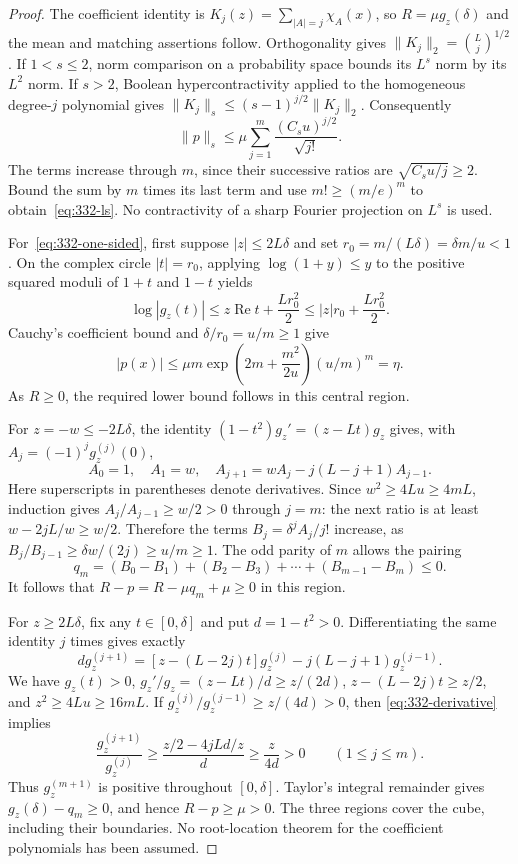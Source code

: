 \documentclass[11pt]{article}
\begin{document}
\begin{proof}
The coefficient identity is
$K_j(z)=\sum_{|A|=j}\chi_A(x)$, so $R=\mu g_z(\delta)$ and the
mean and matching assertions follow. Orthogonality gives
$\|K_j\|_2=\binom Lj^{1/2}$. If $1<s\le2$, norm comparison on a
probability space bounds its $L^s$ norm by its $L^2$ norm. If $s>2$,
Boolean hypercontractivity applied to the homogeneous degree-$j$
polynomial gives $\|K_j\|_s\le(s-1)^{j/2}\|K_j\|_2$.
Consequently
\[
 \|p\|_s\le\mu\sum_{j=1}^m\frac{(C_su)^{j/2}}{\sqrt{j!}}.
\]
The terms increase through $m$, since their successive ratios are
$\sqrt{C_su/j}\ge2$. Bound the sum by $m$ times its last term and use
$m!\ge(m/e)^m$ to obtain~\eqref{eq:332-ls}. No contractivity of a
sharp Fourier projection on $L^s$ is used.

For~\eqref{eq:332-one-sided}, first suppose $|z|\le2L\delta$ and set
$r_0=m/(L\delta)=\delta m/u<1$. On the complex circle $|t|=r_0$,
applying $\log(1+y)\le y$ to the positive squared moduli of $1+t$ and
$1-t$ yields
\[
 \log|g_z(t)|\le z\operatorname{Re}t+\frac{Lr_0^2}{2}
 \le |z|r_0+\frac{Lr_0^2}{2}.
\]
Cauchy's coefficient bound and $\delta/r_0=u/m\ge1$ give
\[
 |p(x)|\le\mu m\exp\left(2m+\frac{m^2}{2u}\right)
                         (u/m)^m=\eta.
\]
As $R\ge0$, the required lower bound follows in this central region.

For $z=-w\le-2L\delta$, the identity
$(1-t^2)g_z'=(z-Lt)g_z$ gives, with
$A_j=(-1)^jg_z^{(j)}(0)$,
\[
 A_0=1,\quad A_1=w,\quad
 A_{j+1}=wA_j-j(L-j+1)A_{j-1}.
\]
Here superscripts in parentheses denote derivatives. Since
$w^2\ge4Lu\ge4mL$, induction gives
$A_j/A_{j-1}\ge w/2>0$ through $j=m$: the next ratio is at least
$w-2jL/w\ge w/2$. Therefore the terms
$B_j=\delta^jA_j/j!$ increase, as
$B_j/B_{j-1}\ge\delta w/(2j)\ge u/m\ge1$.
The odd parity of $m$ allows the pairing
\[
 q_m=(B_0-B_1)+(B_2-B_3)+\cdots+(B_{m-1}-B_m)\le0.
\]
It follows that $R-p=R-\mu q_m+\mu\ge0$ in this region.

For $z\ge2L\delta$, fix any $t\in[0,\delta]$ and put $d=1-t^2>0$.
Differentiating the same identity $j$ times gives exactly
\begin{equation}\label{eq:332-derivative}
 d g_z^{(j+1)}=[z-(L-2j)t]g_z^{(j)}
                    -j(L-j+1)g_z^{(j-1)}.
\end{equation}
We have $g_z(t)>0$, $g_z'/g_z=(z-Lt)/d\ge z/(2d)$,
$z-(L-2j)t\ge z/2$, and $z^2\ge4Lu\ge16mL$.
If $g_z^{(j)}/g_z^{(j-1)}\ge z/(4d)>0$, then
\eqref{eq:332-derivative} implies
\[
 \frac{g_z^{(j+1)}}{g_z^{(j)}}
 \ge\frac{z/2-4jLd/z}{d}\ge\frac{z}{4d}>0
 \qquad(1\le j\le m).
\]
Thus $g_z^{(m+1)}$ is positive throughout $[0,\delta]$.
Taylor's integral remainder gives $g_z(\delta)-q_m\ge0$, and hence
$R-p\ge\mu>0$. The three regions cover the cube, including their
boundaries. No root-location theorem for the coefficient polynomials
has been assumed.
\end{proof}
\end{document}
